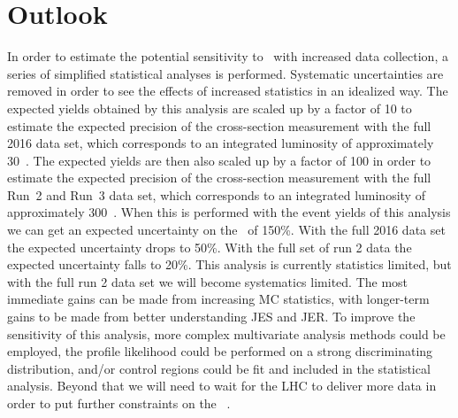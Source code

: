 \section{Outlook}
\label{SECTION-outlook}

In order to estimate the potential sensitivity to \tz~with increased data collection, a series of simplified statistical analyses is performed. Systematic uncertainties are removed in order to see the effects of increased statistics in an idealized way. The expected yields obtained by this analysis are scaled up by a factor of 10 to estimate the expected precision of the cross-section measurement with the full 2016 data set, which corresponds to an integrated luminosity of approximately 30~\fb. The expected yields are then also scaled up by a factor of 100 in order to estimate the expected precision of the cross-section measurement with the full Run~2 and Run~3 data set, which corresponds to an integrated luminosity of approximately 300~\fb. When this is performed with the event yields of this analysis we can get an expected uncertainty on the \xs~of 150\%. With the full 2016 data set the expected uncertainty drops to 50\%. With the full set of run 2 data the expected uncertainty falls to 20\%. This analysis is currently statistics limited, but with the full run 2 data set we will become systematics limited. The most immediate gains can be made from increasing MC statistics, with longer-term gains to be made from better understanding JES and JER. To improve the sensitivity of this analysis, more complex multivariate analysis methods could be employed, the profile likelihood could be performed on a strong discriminating distribution, and/or control regions could be fit and included in the statistical analysis. Beyond that we will need to wait for the LHC to deliver more data in order to put further constraints on the \tz~\xs. 


